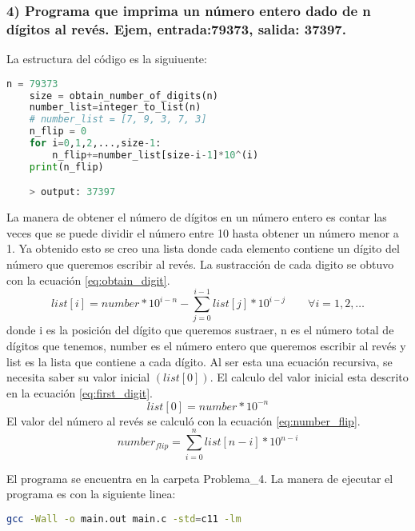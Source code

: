 \subsubsection*{4) Programa que imprima un número entero dado de n dígitos al revés. Ejem, entrada:79373, salida: 37397.}

La estructura del código es la siguiuente:
\begin{lstlisting}[language=python]
    n = 79373
    size = obtain_number_of_digits(n)
    number_list=integer_to_list(n)
    # number_list = [7, 9, 3, 7, 3]
    n_flip = 0
    for i=0,1,2,...,size-1:
        n_flip+=number_list[size-i-1]*10^(i)
    print(n_flip)

    > output: 37397
\end{lstlisting}

La manera de obtener el número de dígitos en un número entero es contar las veces que se puede dividir el número entre 10 hasta obtener un número menor a 1. Ya obtenido esto se creo una lista donde cada elemento contiene un dígito del número que queremos escribir al revés. La sustracción de cada digito se obtuvo con la ecuación \ref{eq:obtain_digit}.
\begin{equation}
    list[i]=number*10^{i-n}- \sum_{j=0}^{i-1} list[j] * 10^{i-j} \qquad \forall i=1,2,\dots
    \label{eq:obtain_digit}
\end{equation}
donde  i es la posición del dígito que queremos sustraer, n es el número total de dígitos que tenemos, number es el número entero que queremos escribir al revés y list es la lista que contiene a cada dígito. Al ser esta una ecuación recursiva, se necesita saber su valor inicial $(list[0])$. El calculo del valor inicial esta descrito en la ecuación \ref{eq:first_digit}.
\begin{equation}
    list[0] = number *10^{-n}
    \label{eq:first_digit}
\end{equation}
El valor del número al revés se calculó con la ecuación \ref{eq:number_flip}.
\begin{equation}
    number_{flip} = \sum_{i=0}^{n} list[n-i]*10^{n-i}
    \label{eq:number_flip}
\end{equation}

El programa se encuentra en la carpeta \textcolor{citecolor}{Problema\_4}. La manera de ejecutar el programa es con la siguiente linea:
\begin{lstlisting}[language=bash]
    gcc -Wall -o main.out main.c -std=c11 -lm
\end{lstlisting}